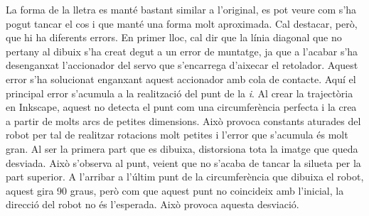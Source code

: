 \begin{itemize}
	La forma de la lletra es manté bastant similar a l'original, es pot veure com s'ha pogut tancar el cos i que manté una forma molt aproximada. Cal destacar, però, que hi ha diferents errors. En primer lloc, cal dir que la línia diagonal que no pertany al dibuix s'ha creat degut a un error de muntatge, ja que a l'acabar s'ha desenganxat l'accionador del servo que s'encarrega d'aixecar el retolador. Aquest error s'ha solucionat enganxant aquest accionador amb cola de contacte. Aquí el principal error s'acumula a la realització del punt de la \textit{i}. Al crear la trajectòria en Inkscape, aquest no detecta el punt com una circumferència perfecta i la crea a partir de molts arcs de petites dimensions. Això provoca constants aturades del robot per tal de realitzar rotacions molt petites i l'error que s'acumula és molt gran. Al ser la primera part que es dibuixa, distorsiona tota la imatge que queda desviada. Això s'observa al punt, veient que no s'acaba de tancar la silueta per la part superior. A l'arribar a l'últim punt de la circumferència que dibuixa el robot, aquest gira 90 graus, però com que aquest punt no coincideix amb l'inicial, la direcció del robot no és l'esperada. Això provoca aquesta desviació. 
	

\end{itemize}

